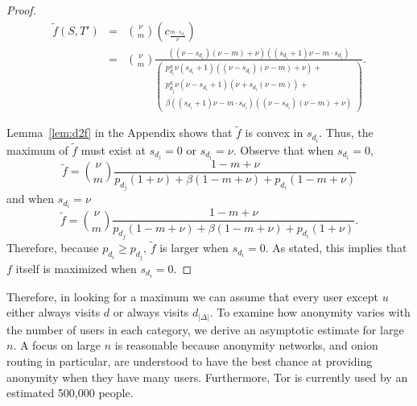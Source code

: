 \documentclass[prodmode,acmtissec]{acmsmall}
\begin{document}
\begin{proof}
\begin{eqnarray*}
  \tilde{f}(S,T') &=& \binom{\nu }{m} \left( c_{\frac{m \cdot s_{d_i}}{\nu }} \right)\\
                  &=& \binom{\nu }{m} \frac{((\nu -s_{d_i})(\nu -m)+\nu )((s_{d_i}+1)\nu -m \cdot s_{d_i})}{\left( \begin{array}{l}p^u_{d_i} \nu (s_{d_i}+1)((\nu -s_{d_i})(\nu -m)+\nu ) + \\ p^u_{d_j}\nu (\nu -s_{d_i}+1)(\nu +s_{d_i}(\nu -m)) + \\ \beta((s_{d_i}+1)\nu -m \cdot s_{d_i})((\nu -s_{d_i})(\nu -m)+\nu ) \end{array} \right)}.
\end{eqnarray*}

Lemma~\ref{lem:d2f} in the Appendix shows that $\tilde{f}$ is convex in $s_{d_i}$.  Thus, the maximum of $\tilde{f}$ must exist at $s_{d_i}=0$ or $s_{d_i} = \nu$.  Observe that when $s_{d_i}=0$,
\begin{equation*}
\tilde{f} = \binom{\nu}{m} \frac{1-m+\nu}{p_{d_j}(1+\nu) + \beta(1 -m+\nu) +p_{d_i} (1-m+\nu )}
\end{equation*}
and when $s_{d_i} = \nu$
\begin{equation*}
\tilde{f} = \binom{\nu}{m} \frac{1-m+\nu}{p_{d_j}(1-m+\nu) + \beta(1 -m+\nu) +p_{d_i} (1+\nu )}.
\end{equation*}
Therefore, because $p_{d_i}\ge p_{d_j}$, $\tilde{f}$ is larger when $s_{d_i}=0$.  As stated, this implies that $f$ itself is maximized when $s_{d_i}=0$.\hfill

\end{proof}

Therefore, in looking for a maximum we can assume that every user except $u$ either always visits $d$ or always visits $d_{|\Delta|}$.  To examine how anonymity varies with the number of users in each category, we derive an asymptotic estimate for large $n$.  A focus on large $n$ is reasonable because anonymity networks, and onion routing in particular, are understood to have the best chance at providing anonymity when they have many users.  Furthermore, Tor is currently used by an estimated 500,000 people.
\end{document}
